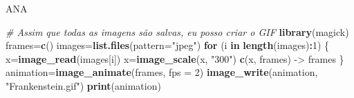 \documentclass[
  ignorenonframetext,
]{beamer}
\newenvironment{Shaded}{\begin{snugshade}}{\end{snugshade}}
\newcommand{\CommentTok}[1]{\textcolor[rgb]{0.56,0.35,0.01}{\textit{#1}}}
\newcommand{\ControlFlowTok}[1]{\textcolor[rgb]{0.13,0.29,0.53}{\textbf{#1}}}
\newcommand{\DataTypeTok}[1]{\textcolor[rgb]{0.13,0.29,0.53}{#1}}
\newcommand{\DecValTok}[1]{\textcolor[rgb]{0.00,0.00,0.81}{#1}}
\newcommand{\KeywordTok}[1]{\textcolor[rgb]{0.13,0.29,0.53}{\textbf{#1}}}
\newcommand{\NormalTok}[1]{#1}
\newcommand{\OperatorTok}[1]{\textcolor[rgb]{0.81,0.36,0.00}{\textbf{#1}}}
\newcommand{\StringTok}[1]{\textcolor[rgb]{0.31,0.60,0.02}{#1}}
\begin{document}
\begin{frame}[fragile]{ANA}
\protect\hypertarget{ana-7}{}

\small

\begin{Shaded}
\begin{Highlighting}[]
\CommentTok{# Assim que todas as imagens são salvas, eu posso criar o GIF}
\KeywordTok{library}\NormalTok{(magick)}
\NormalTok{frames=}\KeywordTok{c}\NormalTok{()}
\NormalTok{images=}\KeywordTok{list.files}\NormalTok{(}\DataTypeTok{pattern=}\StringTok{"jpeg"}\NormalTok{)}
\ControlFlowTok{for}\NormalTok{ (i }\ControlFlowTok{in} \KeywordTok{length}\NormalTok{(images)}\OperatorTok{:}\DecValTok{1}\NormalTok{)}
\NormalTok{\{}
\NormalTok{  x=}\KeywordTok{image_read}\NormalTok{(images[i])}
\NormalTok{  x=}\KeywordTok{image_scale}\NormalTok{(x, }\StringTok{"300"}\NormalTok{)}
  \KeywordTok{c}\NormalTok{(x, frames) ->}\StringTok{ }\NormalTok{frames}
\NormalTok{\}}
\NormalTok{animation=}\KeywordTok{image_animate}\NormalTok{(frames, }\DataTypeTok{fps =} \DecValTok{2}\NormalTok{)}
\KeywordTok{image_write}\NormalTok{(animation, }\StringTok{"Frankenstein.gif"}\NormalTok{)}
\KeywordTok{print}\NormalTok{(animation)}
\end{Highlighting}
\end{Shaded}

\end{frame}
\end{document}
